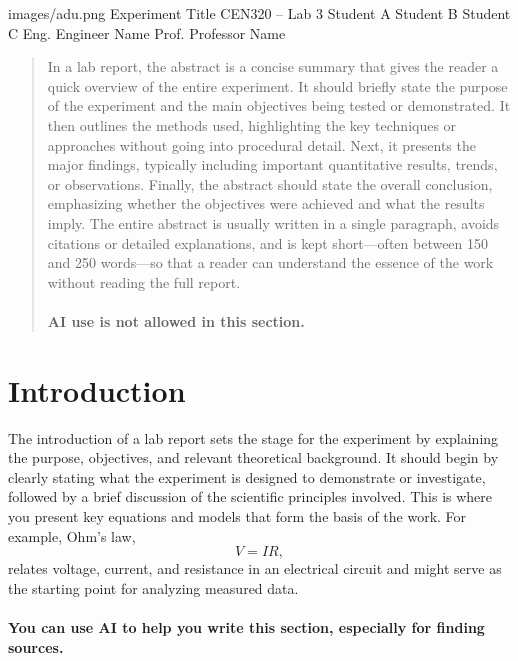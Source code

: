 \documentclass[11pt,a4paper]{article}
\begin{document}
    \begin{labtitlepage}
      {images/adu.png}          %
      {Experiment Title}        %
      {CEN320 -- Lab 3}         %
      {Student A}               %
      {Student B}               %
      {Student C}               %
      {Eng. Engineer Name}      %
      {Prof. Professor Name}    %
    \end{labtitlepage}
    
    \begin{abstract}
        In a lab report, the abstract is a concise summary that gives the reader a quick overview of the entire experiment. It should briefly state the purpose of the experiment and the main objectives being tested or demonstrated. It then outlines the methods used, highlighting the key techniques or approaches without going into procedural detail. Next, it presents the major findings, typically including important quantitative results, trends, or observations. Finally, the abstract should state the overall conclusion, emphasizing whether the objectives were achieved and what the results imply. The entire abstract is usually written in a single paragraph, avoids citations or detailed explanations, and is kept short—often between 150 and 250 words—so that a reader can understand the essence of the work without reading the full report.
        \\\\
        \noindent \textbf{AI use is not allowed in this section.} 
    \end{abstract}
    
    \section{Introduction}
        The introduction of a lab report sets the stage for the experiment by explaining the purpose, objectives, and relevant theoretical background. It should begin by clearly stating what the experiment is designed to demonstrate or investigate, followed by a brief discussion of the scientific principles involved. This is where you present key equations and models that form the basis of the work. For example, Ohm’s law,
        \begin{equation}
            V = IR,
        \label{eq:ohm}
        \end{equation} relates voltage, current, and resistance in an electrical circuit and might serve as the starting point for analyzing measured data. 
        \\\\
        \noindent \textbf{You can use AI to help you write this section, especially for finding sources.} 
    
\end{document}
